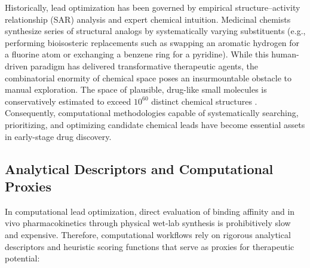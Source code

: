 \documentclass{ieeeaccess}
\begin{document}
Historically, lead optimization has been governed by empirical structure--activity relationship (SAR) analysis and expert chemical intuition. Medicinal chemists synthesize series of structural analogs by systematically varying substituents (e.g., performing bioisosteric replacements such as swapping an aromatic hydrogen for a fluorine atom or exchanging a benzene ring for a pyridine). While this human-driven paradigm has delivered transformative therapeutic agents, the combinatorial enormity of chemical space poses an insurmountable obstacle to manual exploration. The space of plausible, drug-like small molecules is conservatively estimated to exceed $10^{60}$ distinct chemical structures \cite{gomez2018}. Consequently, computational methodologies capable of systematically searching, prioritizing, and optimizing candidate chemical leads have become essential assets in early-stage drug discovery.

\subsection{Analytical Descriptors and Computational Proxies}
In computational lead optimization, direct evaluation of binding affinity and in vivo pharmacokinetics through physical wet-lab synthesis is prohibitively slow and expensive. Therefore, computational workflows rely on rigorous analytical descriptors and heuristic scoring functions that serve as proxies for therapeutic potential:
\end{document}
